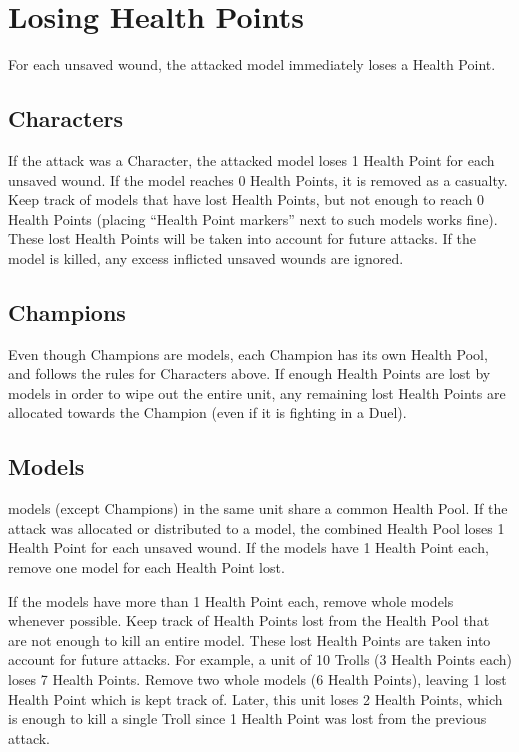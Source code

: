 \section{Losing Health Points}
\label{loosing_health_points}

For each unsaved wound, the attacked model immediately loses a Health Point.

\subsection{Characters}

If the attack was  a Character, the attacked model loses 1 Health Point for each unsaved wound. If the model reaches 0 Health Points, it is removed as a casualty. Keep track of models that have lost Health Points, but not enough to reach 0 Health Points (placing \enquote{Health Point markers} next to such models works fine). These lost Health Points will be taken into account for future attacks. If the model is killed, any excess inflicted unsaved wounds are ignored.

\subsection{Champions}

Even though Champions are \rnf{} models, each Champion has its own Health Pool, and follows the rules for Characters above. If enough Health Points are lost by \rnf{} models in order to wipe out the entire unit, any remaining lost Health Points are allocated towards the Champion (even if it is fighting in a Duel).

\subsection{\rnf{} Models}

\rnf{} models (except Champions) in the same unit share a common Health Pool. If the attack was allocated  or distributed to a \rnf{} model, the combined \rnf{} Health Pool loses 1 Health Point for each unsaved wound. If the \rnf{} models have 1 Health Point each, remove one \rnf{} model for each Health Point lost.

If the \rnf{} models have more than 1 Health Point each, remove whole \rnf{} models whenever possible. Keep track of Health Points lost from the Health Pool that are not enough to kill an entire model. These lost Health Points are taken into account for future attacks. For example, a unit of 10 Trolls (3 Health Points each) loses 7 Health Points. Remove two whole models (6 Health Points), leaving 1 lost Health Point which is kept track of. Later, this unit loses 2 Health Points, which is enough to kill a single Troll since 1 Health Point was lost from the previous attack.

